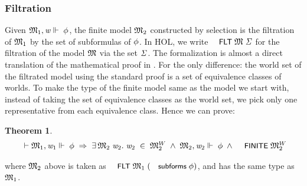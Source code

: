 \documentclass{llncs}
\newtheorem{thm}{Theorem}[chapter]
\newenvironment{holmath}{\begin{displaymath}\begin{array}{l}}{\end{array}\end{displaymath}\ignorespacesafterend}
\renewcommand{\HOLConst}[1]{{\textsf{\upshape\small #1}}}
\renewcommand{\HOLinline}[1]{\ensuremath{#1}}
\begin{document}
\subsubsection{Filtration}
Given \HOLinline{\HOLFreeVar{\ensuremath{\mathfrak{M}}}\sb{\mathrm{1}},\HOLFreeVar{w}\ensuremath{\Vdash}\;\HOLFreeVar{\ensuremath{\phi}}}, the finite model \HOLinline{\HOLFreeVar{\ensuremath{\mathfrak{M}}}\sb{\mathrm{2}}} constructed by selection is the filtration of \HOLinline{\HOLFreeVar{\ensuremath{\mathfrak{M}}}\sb{\mathrm{1}}} by the set of subformulas of \HOLinline{\HOLFreeVar{\ensuremath{\phi}}}. In HOL, we write \HOLinline{\HOLConst{FLT}\;\HOLFreeVar{\ensuremath{\mathfrak{M}}}\;\HOLFreeVar{\ensuremath{\Sigma}}} for the filtration of the model \HOLinline{\HOLFreeVar{\ensuremath{\mathfrak{M}}}} via the set \HOLinline{\HOLFreeVar{\ensuremath{\Sigma}}}. The formalization is almost a direct translation of the mathematical proof in \cite{Blackburn}. For the only difference: the world set of the filtrated model using the standard proof is a set of equivalence classes of worlds. To make the type of the finite model same as the model we start with, instead of taking the set of equivalence classes as the world set, we pick only one representative from each equivalence class. Hence we can prove:
\begin{thm}
{\upshape\cite[Theorem 2.41 (Finite model property, via filtration)]{Blackburn}}
\begin{holmath}
  \ensuremath{\HOLTokenTurnstile}\HOLFreeVar{\ensuremath{\mathfrak{M}}}\sb{\mathrm{1}},\HOLFreeVar{w}\sb{\mathrm{1}}\ensuremath{\Vdash}\;\HOLFreeVar{\ensuremath{\phi}}\;\HOLSymConst{\HOLTokenImp{}}\;\HOLSymConst{\HOLTokenExists{}}\HOLBoundVar{\ensuremath{\mathfrak{M}}}\sb{\mathrm{2}}\;\HOLBoundVar{w}\sb{\mathrm{2}}.\;\HOLBoundVar{w}\sb{\mathrm{2}}\;\HOLSymConst{\HOLTokenIn{}}\;\HOLBoundVar{\ensuremath{\mathfrak{M}}}\sb{\mathrm{2}}\HOLSymConst{\ensuremath{\sp{W}}}\;\HOLSymConst{\HOLTokenConj{}}\;\HOLBoundVar{\ensuremath{\mathfrak{M}}}\sb{\mathrm{2}},\HOLBoundVar{w}\sb{\mathrm{2}}\ensuremath{\Vdash}\;\HOLFreeVar{\ensuremath{\phi}}\;\HOLSymConst{\HOLTokenConj{}}\;\HOLConst{FINITE}\;\HOLBoundVar{\ensuremath{\mathfrak{M}}}\sb{\mathrm{2}}\HOLSymConst{\ensuremath{\sp{W}}}
\end{holmath}
\end{thm}
where \HOLinline{\HOLFreeVar{\ensuremath{\mathfrak{M}}}\sb{\mathrm{2}}} above is taken as \HOLinline{\HOLConst{FLT}\;\HOLFreeVar{\ensuremath{\mathfrak{M}}}\sb{\mathrm{1}}\;(\HOLConst{subforms}\;\HOLFreeVar{\ensuremath{\phi}})}, and has the same type as \HOLinline{\HOLFreeVar{\ensuremath{\mathfrak{M}}}\sb{\mathrm{1}}}. 
\end{document}
